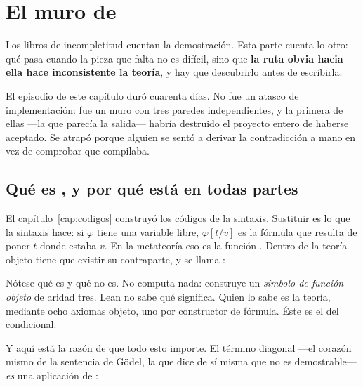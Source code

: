 \chapter{El muro de \texorpdfstring{}{substfc}}
\label{cap:muro-substfc}

Los libros de incompletitud cuentan la demostración. Esta parte cuenta lo otro: qué pasa cuando
la pieza que falta no es difícil, sino que \textbf{la ruta obvia hacia ella hace inconsistente la
teoría}, y hay que descubrirlo antes de escribirla.

El episodio de este capítulo duró cuarenta días. No fue un atasco de implementación: fue un muro
con tres paredes independientes, y la primera de ellas —la que parecía la salida— habría destruido
el proyecto entero de haberse aceptado. Se atrapó porque alguien se sentó a derivar la
contradicción a mano en vez de comprobar que compilaba.

\section{Qué es \texorpdfstring{}{substfc}, y por qué está en todas partes}

El capítulo~\ref{cap:codigos} construyó los códigos de la sintaxis. Sustituir es lo que
la sintaxis hace: si $\varphi$ tiene una variable libre, $\varphi[t/v]$ es la fórmula que resulta de
poner $t$ donde estaba $v$. En la metateoría eso es la función . Dentro de la
teoría objeto tiene que existir su contraparte, y se llama :



Nótese qué es y qué no es. No computa nada: construye un \emph{símbolo de función objeto} de aridad
tres. Lean no sabe qué significa. Quien lo sabe es la teoría, mediante ocho axiomas objeto, uno por
constructor de fórmula. Éste es el del condicional:



Y aquí está la razón de que todo esto importe. El término diagonal —el corazón mismo de la sentencia
de Gödel, la que dice de sí misma que no es demostrable— \emph{es} una aplicación de
:

